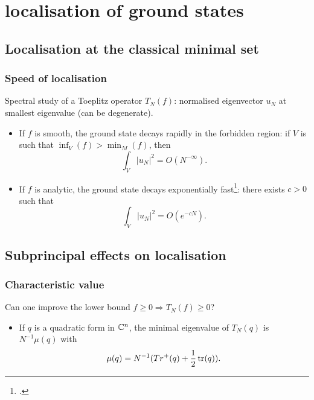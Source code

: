 \documentclass[mathserif]{beamer}
\begin{document}
\section{localisation of ground states}
\subsection{Localisation at the classical minimal set}
\begin{frame}
  \frametitle{Speed of localisation}
  Spectral study of a Toeplitz operator $T_N(f)$: normalised
  eigenvector $u_N$ at smallest eigenvalue (can be degenerate).
  \begin{itemize}
    \item<2->  If $f$ is smooth, the ground state decays
      rapidly in the forbidden region: if $V$ is such that
      $\inf_V(f)>\min_M(f)$, then \[\int_{V}|u_N|^2=O(N^{-\infty}).\]
    \item<3> If $f$ is analytic, the ground state decays exponentially
      fast\footcite{deleporte_toeplitz_2018}: there exists $c>0$ such that
      \[
        \int_{V}|u_N|^2=O(e^{-cN}).
      \]\vspace{-1em}
    \end{itemize}
  \end{frame}

\subsection{Subprincipal effects on localisation}
\begin{frame}
  \frametitle{Characteristic value}
  Can one improve the lower bound $f\geq 0\Rightarrow T_N(f)\geq 0$?
  \begin{itemize}
  \item If $q$ is a quadratic form in $\mathbb{C}^n$, the minimal eigenvalue
    of $T_N(q)$ is $N^{-1}\mu(q)$ with $$\mu(q)=N^{-1}(Tr^+(q)+\frac
    12 \operatorname{tr}(q)).$$

\end{itemize}
\end{frame}
\end{document}
